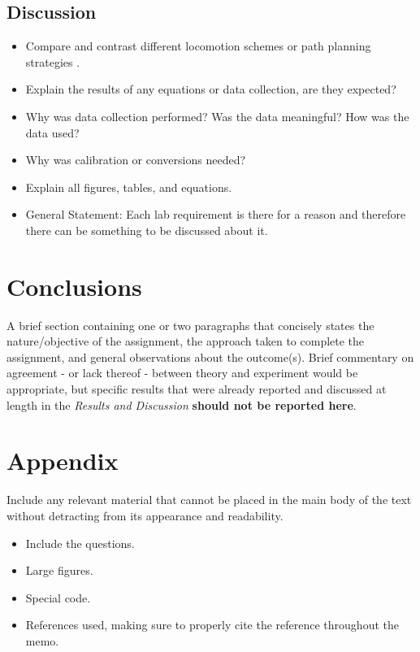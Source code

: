 \documentclass[12pt]{article}
\begin{document}
\subsection*{Discussion}
\begin{itemize}
    \item Compare and contrast different locomotion schemes or path planning strategies .
    \item Explain the results of any equations or data collection, are they expected?
    \item Why was data collection performed? Was the data meaningful? How was the data used?
    \item Why was calibration or conversions needed?
    \item Explain all figures, tables, and equations.
    \item General Statement: Each lab requirement is there for a reason and therefore there can be something to be discussed about it.
\end{itemize}
\section*{Conclusions}
A brief section containing one or two paragraphs that concisely states the nature/objective of the assignment, the approach taken to complete the assignment, and general observations about the outcome(s). Brief commentary on agreement - or lack thereof - between theory and experiment would be appropriate, but specific results that were already reported and discussed at length in the \textit{Results and Discussion} \textbf{should not be reported here}.

\section*{Appendix}
Include any relevant material that cannot be placed in the main body of the text without detracting from its appearance and readability.
\begin{itemize}
    \item Include the questions.
    \item Large figures.
    \item Special code.
    \item References used, making sure to properly cite the reference throughout the memo.
\end{itemize}
\end{document}
